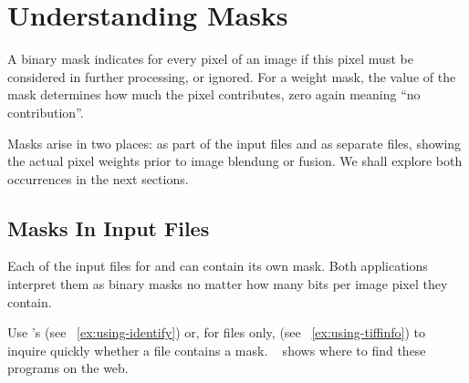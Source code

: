

\chapter[Understanding Masks\commonpart]{\label{sec:understanding-masks}%
  Understanding Masks\commonpart}

%
%
%
A binary mask indicates for every pixel of an image if this pixel must be considered in further
processing, or ignored.  For a weight mask, the value of the mask determines how much the pixel
contributes, zero again meaning ``no contribution''.

Masks arise in two places: as part of the input files and as separate files, showing the actual
pixel weights prior to image blendung or fusion.  We shall explore both occurrences in the next
sections.


\section[Masks In Input Files]{\label{sec:masks-in-input-files}%
  Masks In Input Files}

Each of the input files for \App{} and \OtherApp{} can contain its own mask.  Both applications
interpret them as binary masks no matter how many bits per image pixel they contain.

Use 's  (see
\exampleName~\ref{ex:using-identify}) or, for  files only,  (see \exampleName~\ref{ex:using-tiffinfo}) to inquire
quickly whether a file contains a mask.  \appendixName~ shows
where to find these programs on the web.

